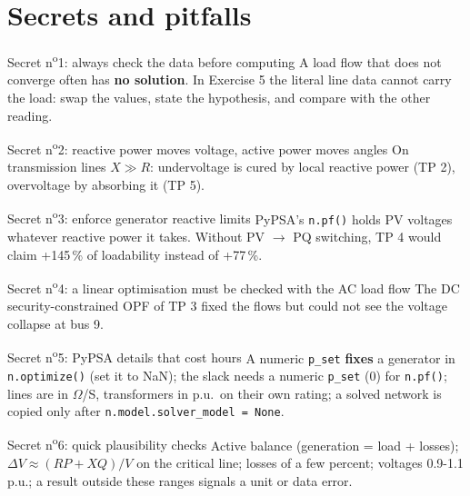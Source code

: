 \documentclass[11pt,a4paper]{article}
\begin{document}
\section{Secrets and pitfalls}
\begin{gbox}{Secret n\textsuperscript{o}1: always check the data before computing}
A load flow that does not converge often has \textbf{no solution}. In Exercise 5 the literal line data cannot carry the
load: swap the values, state the hypothesis, and compare with the other reading.
\end{gbox}
\begin{gbox}{Secret n\textsuperscript{o}2: reactive power moves voltage, active power moves angles}
On transmission lines $X \gg R$: undervoltage is cured by local reactive power (TP 2), overvoltage by absorbing it (TP 5).
\end{gbox}
\begin{gbox}{Secret n\textsuperscript{o}3: enforce generator reactive limits}
PyPSA's \texttt{n.pf()} holds PV voltages whatever reactive power it takes. Without PV $\to$ PQ switching, TP 4 would
claim +145\,\% of loadability instead of +77\,\%.
\end{gbox}
\begin{gbox}{Secret n\textsuperscript{o}4: a linear optimisation must be checked with the AC load flow}
The DC security-constrained OPF of TP 3 fixed the flows but could not see the voltage collapse at bus 9.
\end{gbox}
\begin{gbox}{Secret n\textsuperscript{o}5: PyPSA details that cost hours}
A numeric \texttt{p\_set} \textbf{fixes} a generator in \texttt{n.optimize()} (set it to NaN); the slack needs a numeric
\texttt{p\_set} (0) for \texttt{n.pf()}; lines are in $\Omega$/S, transformers in p.u.\ on their own rating; a solved network
is copied only after \texttt{n.model.solver\_model = None}.
\end{gbox}
\begin{gbox}{Secret n\textsuperscript{o}6: quick plausibility checks}
Active balance (generation = load + losses); $\Delta V \approx (RP + XQ)/V$ on the critical line; losses of a few percent;
voltages 0.9-1.1 p.u.; a result outside these ranges signals a unit or data error.
\end{gbox}
\end{document}
